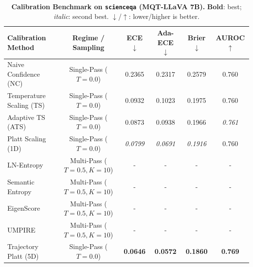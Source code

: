 \begin{table}[t]
\setlength{\tabcolsep}{4pt}
\renewcommand{\arraystretch}{1.05}
\centering
\footnotesize
\begin{tabular}{lccccc}
\toprule
\textbf{Calibration Method} & \textbf{Regime / Sampling} & \textbf{ECE} $\downarrow$ & \textbf{Ada-ECE} $\downarrow$ & \textbf{Brier} $\downarrow$ & \textbf{AUROC} $\uparrow$ \\
\midrule
Naive Confidence (NC) & Single-Pass ($T = 0.0$) & 0.2365 & 0.2317 & 0.2579 & 0.760 \\
Temperature Scaling (TS) & Single-Pass ($T = 0.0$) & 0.0932 & 0.1023 & 0.1975 & 0.760 \\
Adaptive TS (ATS) & Single-Pass ($T = 0.0$) & 0.0873 & 0.0938 & 0.1966 & \textit{0.761} \\
Platt Scaling (1D) & Single-Pass ($T = 0.0$) & \textit{0.0799} & \textit{0.0691} & \textit{0.1916} & 0.760 \\
LN-Entropy & Multi-Pass ($T = 0.5, K = 10$) & - & - & - & - \\
Semantic Entropy & Multi-Pass ($T = 0.5, K = 10$) & - & - & - & - \\
EigenScore & Multi-Pass ($T = 0.5, K = 10$) & - & - & - & - \\
UMPIRE & Multi-Pass ($T = 0.5, K = 10$) & - & - & - & - \\
Trajectory Platt (5D) & Single-Pass ($T = 0.0$) & \textbf{0.0646} & \textbf{0.0572} & \textbf{0.1860} & \textbf{0.769} \\
\bottomrule
\end{tabular}
\caption{\textbf{Calibration Benchmark on \texttt{scienceqa} (MQT-LLaVA 7B).} \textbf{Bold}: best; \textit{italic}: second best. $\downarrow$/$\uparrow$: lower/higher is better.}
\label{tab:benchmark_mqt_scienceqa}
\end{table}
